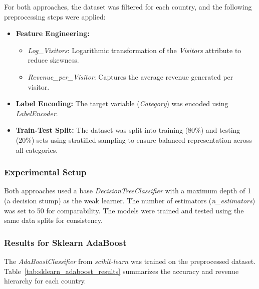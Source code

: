 \documentclass{article}
\begin{document}
For both approaches, the dataset was filtered for each country, and the following preprocessing steps were applied:
\begin{itemize}
    \item \textbf{Feature Engineering:}
    \begin{itemize}
        \item \textit{Log\_Visitors}: Logarithmic transformation of the \textit{Visitors} attribute to reduce skewness.
        \item \textit{Revenue\_per\_Visitor}: Captures the average revenue generated per visitor.
    \end{itemize}
    \item \textbf{Label Encoding:} The target variable (\textit{Category}) was encoded using \textit{LabelEncoder}.
    \item \textbf{Train-Test Split:} The dataset was split into training (80\%) and testing (20\%) sets using stratified sampling to ensure balanced representation across all categories.
\end{itemize}

\subsubsection{Experimental Setup}

Both approaches used a base \textit{DecisionTreeClassifier} with a maximum depth of 1 (a decision stump) as the weak learner. The number of estimators (\textit{n\_estimators}) was set to 50 for comparability. The models were trained and tested using the same data splits for consistency.

\subsubsection{Results for Sklearn AdaBoost}

The \textit{AdaBoostClassifier} from \textit{scikit-learn} was trained on the preprocessed dataset. Table~\ref{tab:sklearn_adaboost_results} summarizes the accuracy and revenue hierarchy for each country.
\end{document}
